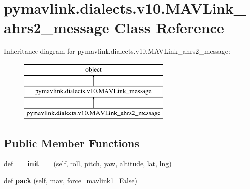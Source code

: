 \hypertarget{classpymavlink_1_1dialects_1_1v10_1_1MAVLink__ahrs2__message}{}\section{pymavlink.\+dialects.\+v10.\+M\+A\+V\+Link\+\_\+ahrs2\+\_\+message Class Reference}
\label{classpymavlink_1_1dialects_1_1v10_1_1MAVLink__ahrs2__message}
Inheritance diagram for pymavlink.\+dialects.\+v10.\+M\+A\+V\+Link\+\_\+ahrs2\+\_\+message\+:\begin{figure}[H]
\begin{center}
\leavevmode
\includegraphics[height=3.000000cm]{classpymavlink_1_1dialects_1_1v10_1_1MAVLink__ahrs2__message}
\end{center}
\end{figure}
\subsection*{Public Member Functions}
\begin{DoxyCompactItemize}
\item 
\mbox{\label{classpymavlink_1_1dialects_1_1v10_1_1MAVLink__ahrs2__message_a787881b1aa57a0fba0e44fe6a31c7174}} 
def {\bfseries \+\_\+\+\_\+init\+\_\+\+\_\+} (self, roll, pitch, yaw, altitude, lat, lng)
\item 
\mbox{\label{classpymavlink_1_1dialects_1_1v10_1_1MAVLink__ahrs2__message_a5e643616bd00e17385f3e104e9b62bce}} 
def {\bfseries pack} (self, mav, force\+\_\+mavlink1=False)
\end{DoxyCompactItemize}
